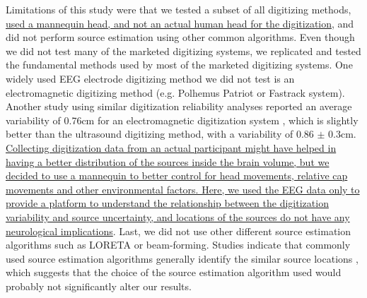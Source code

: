 \documentclass[../thesis_seyed.tex]{subfiles}
\begin{document}
Limitations of this study were that we tested a subset of all digitizing methods, \ul{used a mannequin head, and not an actual human head for the digitization}, and did not perform source estimation using other common algorithms. Even though we did not test many of the marketed digitizing systems, we replicated and tested the fundamental methods used by most of the marketed digitizing systems. One widely used EEG electrode digitizing method we did not test is an electromagnetic digitizing method (e.g. Polhemus Patriot or Fastrack system). Another study using similar digitization reliability analyses reported an average variability of 0.76cm for an electromagnetic digitization system \cite{Clausner2017-hv}, which is slightly better than the ultrasound digitizing method, with a variability of 0.86 $\pm$ 0.3cm. \ul{Collecting digitization data from an actual participant might have helped in having a better distribution of the sources inside the brain volume, but we decided to use a mannequin to better control for head movements, relative cap movements and other environmental factors. Here, we used the EEG data only to provide a platform to understand the relationship between the digitization variability and source uncertainty, and locations of the sources do not have any neurological implications}. Last, we did not use other different source estimation algorithms such as LORETA or beam-forming. Studies indicate that commonly used source estimation algorithms generally identify the similar source locations \cite{Mahjoory2017-jv,Bradley2016-sk,Song2015-fv}, which suggests that the choice of the source estimation algorithm used would probably not significantly alter our results. 
\end{document}
